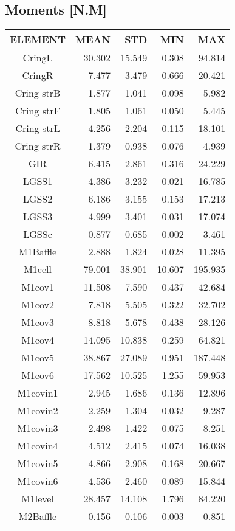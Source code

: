 \subsection{Moments [N.M]}
\begin{longtable}{crrrr}\toprule
 ELEMENT & MEAN & STD & MIN & MAX \\\hline
 CringL & 30.302 & 15.549 & 0.308 & 94.814 \\
 CringR & 7.477 & 3.479 & 0.666 & 20.421 \\
 Cring strB & 1.877 & 1.041 & 0.098 & 5.982 \\
 Cring strF & 1.805 & 1.061 & 0.050 & 5.445 \\
 Cring strL & 4.256 & 2.204 & 0.115 & 18.101 \\
 Cring strR & 1.379 & 0.938 & 0.076 & 4.939 \\
 GIR & 6.415 & 2.861 & 0.316 & 24.229 \\
 LGSS1 & 4.386 & 3.232 & 0.021 & 16.785 \\
 LGSS2 & 6.186 & 3.155 & 0.153 & 17.213 \\
 LGSS3 & 4.999 & 3.401 & 0.031 & 17.074 \\
 LGSSc & 0.877 & 0.685 & 0.002 & 3.461 \\
 M1Baffle & 2.888 & 1.824 & 0.028 & 11.395 \\
 M1cell & 79.001 & 38.901 & 10.607 & 195.935 \\
 M1cov1 & 11.508 & 7.590 & 0.437 & 42.684 \\
 M1cov2 & 7.818 & 5.505 & 0.322 & 32.702 \\
 M1cov3 & 8.818 & 5.678 & 0.438 & 28.126 \\
 M1cov4 & 14.095 & 10.838 & 0.259 & 64.821 \\
 M1cov5 & 38.867 & 27.089 & 0.951 & 187.448 \\
 M1cov6 & 17.562 & 10.525 & 1.255 & 59.953 \\
 M1covin1 & 2.945 & 1.686 & 0.136 & 12.896 \\
 M1covin2 & 2.259 & 1.304 & 0.032 & 9.287 \\
 M1covin3 & 2.498 & 1.422 & 0.075 & 8.251 \\
 M1covin4 & 4.512 & 2.415 & 0.074 & 16.038 \\
 M1covin5 & 4.866 & 2.908 & 0.168 & 20.667 \\
 M1covin6 & 4.536 & 2.460 & 0.089 & 15.844 \\
 M1level & 28.457 & 14.108 & 1.796 & 84.220 \\
 M2Baffle & 0.156 & 0.106 & 0.003 & 0.851 \\

\end{longtable}
